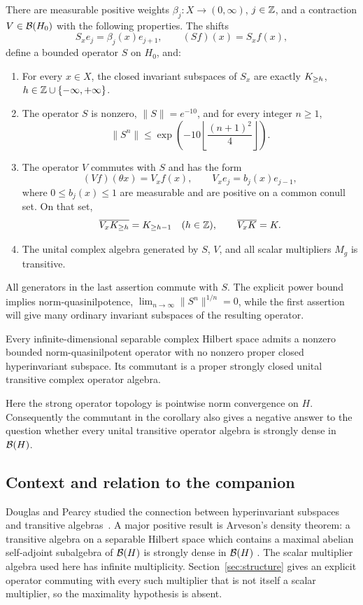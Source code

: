 \begin{theorem}\label{thm:direct-model}
There are measurable positive weights $\beta_j:X\to(0,\infty)$,
$j\in\mathbb Z$, and a contraction $V\in\mathcal B(H_0)$ with the following properties.
The shifts
\[
 S_xe_j=\beta_j(x)e_{j+1},\qquad (Sf)(x)=S_xf(x),
\]
define a bounded operator $S$ on $H_0$, and:
\begin{enumerate}
\item For every $x\in X$, the closed invariant subspaces of $S_x$ are
exactly $K_{\ge h}$, $h\in\mathbb Z\cup\{-\infty,+\infty\}$.
\item The operator $S$ is nonzero, $\|S\|=e^{-10}$, and for every
integer $n\ge1$,
\begin{equation}\label{eq:main-power-bound}
 \|S^n\|\le
 \exp\left(-10\left\lfloor\frac{(n+1)^2}{4}\right\rfloor\right).
\end{equation}
\item The operator $V$ commutes with $S$ and has the form
\[
 (Vf)(\theta x)=V_xf(x),\qquad V_xe_j=b_j(x)e_{j-1},
\]
where $0\le b_j(x)\le1$ are measurable and are positive on a common
conull set. On that set,
\[
 \overline{V_xK_{\ge h}}=K_{\ge h-1}\quad(h\in\mathbb Z),
 \qquad \overline{V_xK}=K.
\]
\item The unital complex algebra generated by $S$, $V$, and all
scalar multipliers $M_g$ is transitive.
\end{enumerate}
\end{theorem}

All generators in the last assertion commute with $S$. The explicit
power bound implies norm-quasinilpotence,
$\lim_{n\to\infty}\|S^n\|^{1/n}=0$, while the first assertion will give
many ordinary invariant subspaces of the resulting operator.

\begin{corollary}\label{cor:direct-algebra}
Every infinite-dimensional separable complex Hilbert space admits a
nonzero bounded norm-quasinilpotent operator with no nonzero proper
closed hyperinvariant subspace. Its commutant is a proper strongly
closed unital transitive complex operator algebra.
\end{corollary}

Here the strong operator topology is pointwise norm convergence on
$H$. Consequently the commutant in the corollary also gives a negative
answer to the question whether every unital transitive operator algebra
is strongly dense in $\mathcal B(H)$.

\subsection{Context and relation to the companion}
Douglas and Pearcy studied the connection between hyperinvariant
subspaces and transitive algebras~\cite{DouglasPearcy1972}. A major
positive result is Arveson's density theorem: a transitive algebra on
a separable Hilbert space which contains a maximal abelian self-adjoint
subalgebra of $\mathcal B(H)$ is strongly dense in $\mathcal B(H)$
\cite[Theorem~3.3]{Arveson1967}. The scalar multiplier algebra used here
has infinite multiplicity. Section~\ref{sec:structure} gives an explicit
operator commuting with every such multiplier that is not itself a
scalar multiplier, so the maximality hypothesis is absent.


